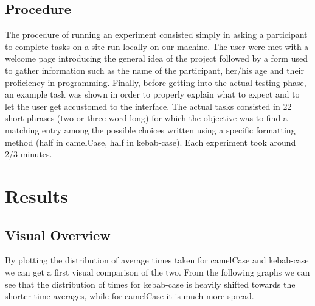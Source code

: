 \documentclass{article}
\begin{document}
\subsection{Procedure}
The procedure of running an experiment consisted simply in asking a participant to complete tasks on a site run locally on our machine. 
The user were met with a welcome page introducing the general idea of the project followed by a form used to gather information such as the 
name of the participant, her/his age and their proficiency in programming. Finally, before getting into the actual testing phase, an example 
task was shown in order to properly explain what to expect and to let the user get accustomed to the interface. The actual tasks consisted in 
22 short phrases (two or three word long) for which the objective was to find a matching entry among the possible choices written using a 
specific formatting method (half in camelCase, half in kebab-case).
Each experiment took around 2/3 minutes.
\section{Results}

\subsection{Visual Overview}
By plotting the distribution of average times taken for camelCase and kebab-case we can get a first visual comparison of the two. 
From the following graphs we can see that the distribution of times for kebab-case is heavily shifted towards the shorter time averages, while 
for camelCase it is much more spread.
\end{document}
